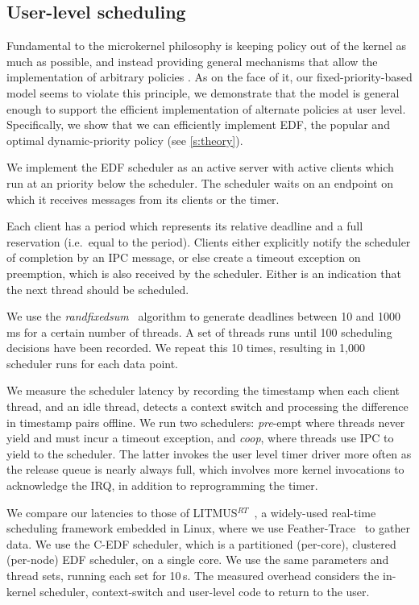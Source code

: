 
\subsection{User-level scheduling}\label{s:edf-impl}

Fundamental to the microkernel philosophy is keeping policy out of the
kernel as much as possible, and instead providing general mechanisms
that allow the implementation of arbitrary policies
\citep{Heiser_Elphinstone_16}.  As on the face of it, our
fixed-priority-based model seems to violate this principle,  we
demonstrate that the model is general enough to support the efficient
implementation of alternate policies at user level. Specifically, we
show that we can efficiently implement \gls{EDF}, the popular and  optimal dynamic-priority policy (see \autoref{s:theory}).

We implement the EDF scheduler as an active server with active
clients which run at an \selfour priority below the scheduler.
The scheduler waits on an endpoint on which it receives messages from
its clients or the timer.

Each client has a period which represents its relative deadline and a full reservation (i.e.\ equal to the period). Clients
either explicitly notify the scheduler of completion by an IPC
message, or else create a timeout exception on preemption, which is also received by the
scheduler. Either is an indication that the next thread should be scheduled.

We use the \emph{randfixedsum}~\citep{Emberson_SD_10} algorithm to
generate deadlines between 10 and 1000\,ms for a certain number of threads.
A set of threads runs until 100
scheduling decisions have been recorded. We repeat this 10 times,
resulting in 1,000 scheduler runs for each data point.

We measure the scheduler latency by recording the timestamp when each client thread, and an idle
thread, detects a
context switch and processing the difference in timestamp pairs offline. We run two schedulers:
\emph{pre}-empt where threads never yield and must incur a timeout exception, and \emph{coop}, where
threads use IPC to yield to the scheduler. The latter invokes the user level timer
driver more often as the release queue is nearly always full, which involves more kernel invocations
to acknowledge the IRQ, in addition to reprogramming the timer.

We compare our latencies to those of
LITMUS$^{RT}$~\citep{Calandrino_LBDA_07}, a widely-used real-time scheduling
framework embedded in Linux, where we use Feather-Trace~\citep{Brandenburg_Anderson_07} to gather data.
We use the C-EDF scheduler, which is a partitioned (per-core), clustered (per-node) EDF scheduler, on a single
core. We use the same parameters and thread sets, running each set for 10\,s. 
The measured overhead considers the in-kernel scheduler, context-switch and user-level code to return to
the user.

